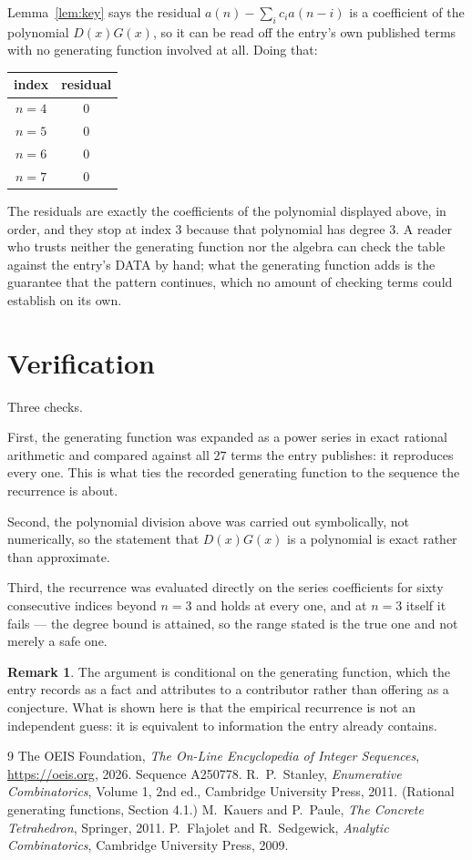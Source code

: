 \documentclass[11pt,a4paper]{article}
\theoremstyle{plain}
\theoremstyle{definition}
\newtheorem{remark}[theorem]{Remark}
\begin{document}
Lemma~\ref{lem:key} says the residual $a(n)-\sum_ic_ia(n-i)$ is a coefficient of the
polynomial $D(x)G(x)$, so it can be read off the entry's own published terms with no
generating function involved at all. Doing that:
\begin{center}
\begin{tabular}{cc}
index & residual \\ \hline
$n=4$ & $0$ \\
$n=5$ & $0$ \\
$n=6$ & $0$ \\
$n=7$ & $0$
\end{tabular}
\end{center}
The residuals are exactly the coefficients of the polynomial displayed above, in order, and
they stop at index $3$ because that polynomial has degree $3$. A reader who trusts
neither the generating function nor the algebra can check the table against the entry's DATA
by hand; what the generating function adds is the guarantee that the pattern continues, which
no amount of checking terms could establish on its own.

\section{Verification}

Three checks.

First, the generating function was expanded as a power series in exact rational arithmetic and
compared against all $27$ terms the entry publishes: it reproduces every one. This is
what ties the recorded generating function to the sequence the recurrence is about.

Second, the polynomial division above was carried out symbolically, not numerically, so the
statement that $D(x)G(x)$ is a polynomial is exact rather than approximate.

Third, the recurrence was evaluated directly on the series coefficients for sixty consecutive
indices beyond $n=3$ and holds at every one, and at $n=3$ itself it fails --- the
degree bound is attained, so the range stated is the true one and not merely a safe one.

\begin{remark}
The argument is conditional on the generating function, which the entry records as a fact and
attributes to a contributor rather than offering as a conjecture. What is shown here is that
the empirical recurrence is not an independent guess: it is equivalent to information the
entry already contains.
\end{remark}

\begin{thebibliography}{9}
 The OEIS Foundation, \emph{The On-Line Encyclopedia of Integer
Sequences}, \url{https://oeis.org}, 2026. Sequence A250778.
 R.~P.~Stanley, \emph{Enumerative Combinatorics}, Volume 1, 2nd ed.,
Cambridge University Press, 2011. (Rational generating functions, Section 4.1.)
 M.~Kauers and P.~Paule, \emph{The Concrete Tetrahedron}, Springer, 2011.
 P.~Flajolet and R.~Sedgewick, \emph{Analytic Combinatorics}, Cambridge
University Press, 2009.
\end{thebibliography}
\end{document}
